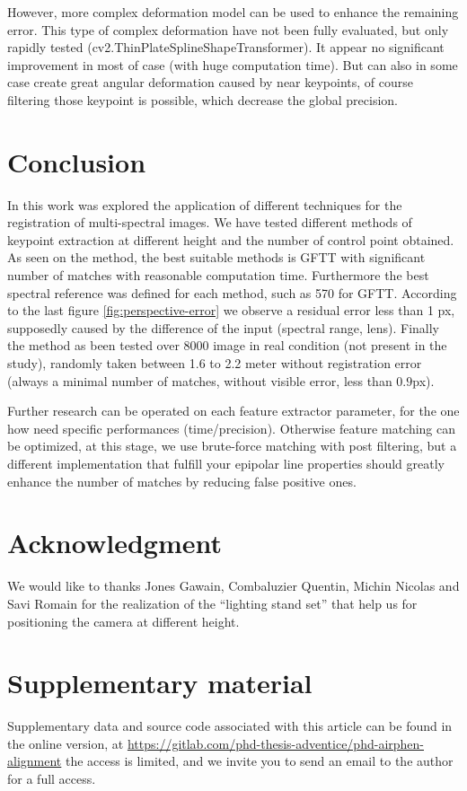 \documentclass[]{elsarticle}
\begin{document}
			However, more complex deformation model \cite{10.1007/978-3-642-33709-3_3} can be used to enhance the remaining error.
			This type of complex deformation have not been fully evaluated, but only rapidly tested (cv2.ThinPlateSplineShapeTransformer).
			It appear no significant improvement in most of case (with huge computation time).
			But can also in some case create great angular deformation caused by near keypoints,
			of course filtering those keypoint is possible, which decrease the global precision.
		
		
	\section{Conclusion}
	
		In this work was explored the application of different techniques for the registration of multi-spectral images.
		We have tested different methods of keypoint extraction at different height and the number of control point obtained.
		As seen on the method, the best suitable methods is GFTT with significant number of matches with reasonable computation time.
		Furthermore the best spectral reference was defined for each method, such as 570 for GFTT.
		According to the last figure \ref{fig:perspective-error} we observe a residual error less than 1 px,
		supposedly caused by the difference of the input (spectral range, lens).
		Finally the method as been tested over 8000 image in real condition (not present in the study),
		randomly taken between 1.6 to 2.2 meter without registration error (always a minimal number of matches, without visible error, less than $0.9$px).
		\\
		\par Further research can be operated on each feature extractor parameter, for the one how need specific performances (time/precision).
		Otherwise feature matching can be optimized, at this stage, we use brute-force matching with post filtering,
		but a different implementation that fulfill your epipolar line properties should greatly enhance the number of matches by reducing false positive ones.
		
	\section{Acknowledgment}
	
		We would like to thanks Jones Gawain, Combaluzier Quentin, Michin Nicolas and Savi Romain
		for the realization of the ``lighting stand set'' that help us for positioning the camera at different height.
		
	\section{Supplementary material}
		
		Supplementary data and source code associated with this article can be found in the online version, at
		\url{https://gitlab.com/phd-thesis-adventice/phd-airphen-alignment} the access is limited,
		and we invite you to send an email to the author for a full access.
		
	
	
		
\end{document}
